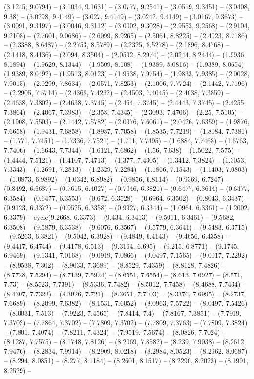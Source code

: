 (3.1245, 9.0794) -- (3.1034, 9.1631) -- (3.0777, 9.2541) -- (3.0519, 9.3451) -- (3.0408, 9.38) -- (3.0298, 9.4149) -- (3.027, 9.4149) -- (3.0242, 9.4149) -- (3.0167, 9.3673) -- (3.0091, 9.3197) -- (3.0046, 9.3112) -- (3.0002, 9.3028) -- (2.9553, 9.2568) -- (2.9104, 9.2108) -- (2.7601, 9.0686) -- (2.6099, 8.9265) -- (2.5061, 8.8225) -- (2.4023, 8.7186) -- (2.3388, 8.6487) -- (2.2753, 8.5789) -- (2.2325, 8.5278) -- (2.1896, 8.4768) -- (2.1418, 8.4136) -- (2.094, 8.3504) -- (2.0592, 8.2974) -- (2.0244, 8.2444) -- (1.9936, 8.1894) -- (1.9629, 8.1344) -- (1.9509, 8.108) -- (1.9389, 8.0816) -- (1.9389, 8.0654) -- (1.9389, 8.0492) -- (1.9513, 8.0123) -- (1.9638, 7.9754) -- (1.9833, 7.9385) -- (2.0028, 7.9015) -- (2.0299, 7.8634) -- (2.0571, 7.8253) -- (2.1006, 7.7724) -- (2.1442, 7.7196) -- (2.2905, 7.5714) -- (2.4368, 7.4232) -- (2.4503, 7.4045) -- (2.4638, 7.3859) -- (2.4638, 7.3802) -- (2.4638, 7.3745) -- (2.454, 7.3745) -- (2.4443, 7.3745) -- (2.4255, 7.3864) -- (2.4067, 7.3983) -- (2.358, 7.4345) -- (2.3093, 7.4706) -- (2.25, 7.5105) -- (2.1908, 7.5503) -- (2.1442, 7.5782) -- (2.0976, 7.6061) -- (2.0426, 7.6359) -- (1.9876, 7.6658) -- (1.9431, 7.6858) -- (1.8987, 7.7058) -- (1.8535, 7.7219) -- (1.8084, 7.7381) -- (1.771, 7.7451) -- (1.7336, 7.7521) -- (1.711, 7.7495) -- (1.6884, 7.7468) -- (1.6763, 7.7406) -- (1.6643, 7.7344) -- (1.6121, 7.6862) -- (1.56, 7.638) -- (1.5022, 7.575) -- (1.4444, 7.5121) -- (1.4107, 7.4713) -- (1.377, 7.4305) -- (1.3412, 7.3824) -- (1.3053, 7.3343) -- (1.2691, 7.2813) -- (1.2329, 7.2284) -- (1.1866, 7.1543) -- (1.1403, 7.0803) -- (1.0873, 6.9892) -- (1.0342, 6.8982) -- (0.9856, 6.8114) -- (0.9369, 6.7247) -- (0.8492, 6.5637) -- (0.7615, 6.4027) -- (0.7046, 6.3821) -- (0.6477, 6.3614) -- (0.6477, 6.3584) -- (0.6477, 6.3553) -- (0.672, 6.3528) -- (0.6964, 6.3502) -- (0.8043, 6.3437) -- (0.9123, 6.3372) -- (0.9525, 6.3358) -- (0.9927, 6.3344) -- (1.0964, 6.3361) -- (1.2002, 6.3379) -- cycle(9.2668, 6.3373) -- (9.434, 6.3413) -- (9.5011, 6.3461) -- (9.5682, 6.3508) -- (9.5879, 6.3538) -- (9.6076, 6.3567) -- (9.5779, 6.3641) -- (9.5483, 6.3715) -- (9.5263, 6.3821) -- (9.5042, 6.3928) -- (9.4849, 6.4143) -- (9.4656, 6.4358) -- (9.4417, 6.4744) -- (9.4178, 6.513) -- (9.3164, 6.695) -- (9.215, 6.8771) -- (9.1745, 6.9469) -- (9.1341, 7.0168) -- (9.0919, 7.0866) -- (9.0497, 7.1565) -- (9.0017, 7.2292) -- (8.9538, 7.302) -- (8.9033, 7.3689) -- (8.8529, 7.4359) -- (8.8128, 7.4826) -- (8.7728, 7.5294) -- (8.7139, 7.5924) -- (8.6551, 7.6554) -- (8.613, 7.6927) -- (8.571, 7.73) -- (8.5523, 7.7391) -- (8.5336, 7.7482) -- (8.5012, 7.7458) -- (8.4688, 7.7434) -- (8.4307, 7.7322) -- (8.3926, 7.721) -- (8.3651, 7.7103) -- (8.3376, 7.6995) -- (8.2737, 7.6689) -- (8.2099, 7.6382) -- (8.1531, 7.6052) -- (8.0963, 7.5722) -- (8.0497, 7.5426) -- (8.0031, 7.513) -- (7.9223, 7.4565) -- (7.8414, 7.4) -- (7.8167, 7.3851) -- (7.7919, 7.3702) -- (7.7864, 7.3702) -- (7.7809, 7.3702) -- (7.7809, 7.3763) -- (7.7809, 7.3824) -- (7.801, 7.4074) -- (7.8211, 7.4324) -- (7.9519, 7.5674) -- (8.0826, 7.7024) -- (8.1287, 7.7575) -- (8.1748, 7.8126) -- (8.2069, 7.8582) -- (8.239, 7.9038) -- (8.2612, 7.9476) -- (8.2834, 7.9914) -- (8.2909, 8.0218) -- (8.2984, 8.0523) -- (8.2962, 8.0687) -- (8.294, 8.0851) -- (8.277, 8.1184) -- (8.2601, 8.1517) -- (8.2296, 8.2023) -- (8.1991, 8.2529) -- 